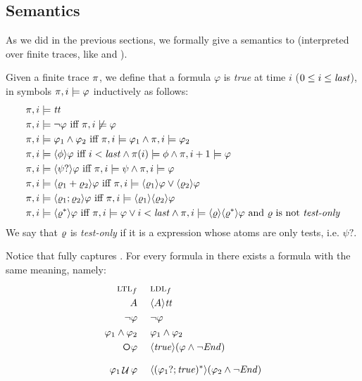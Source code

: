 \subsection{Semantics}\label{sect:ldlf-semantics}
As we did in the previous sections, we formally give a semantics to \LDLf (interpreted over finite traces, like \LTLf and \REGEX).

\begin{definition}\label{def:ldlf-truth}
	Given a finite trace $\pi$, we define that a \LDLf formula $\varphi$ is \emph{true} at time $i$ ($0 \le i \le \mathit{last}$), in symbols $\pi, i \models \varphi$ inductively as follows:
	\begin{align*}
	\pi, i &\models {\mathit{tt}}\nonumber\\
	\pi, i &\models \lnot \varphi \ \text{iff}\  \pi, i \not\models \varphi\nonumber\\
	\pi, i &\models \varphi_1 \wedge \varphi_2 \ \text{iff}\  \pi, i \models \varphi_1 \wedge \pi, i \models \varphi_2\nonumber\\
	\pi, i &\models \langle \phi \rangle\varphi \ \text{iff}\  i<\mathit{last} \wedge \pi(i) \models \phi \wedge \pi, i+1 \models \varphi\\
	\pi, i &\models \langle \psi? \rangle\varphi \ \text{iff}\  \pi, i \models \psi \wedge \pi, i \models \varphi\\
	\pi, i &\models \langle \varrho_1 + \varrho_2 \rangle\varphi \ \text{iff}\  \pi, i \models \langle \varrho_1 \rangle\varphi \vee \langle \varrho_2 \rangle\varphi\\
	\pi, i &\models \langle \varrho_1 ; \varrho_2 \rangle\varphi \ \text{iff}\  \pi, i \models \langle \varrho_1 \rangle\langle \varrho_2 \rangle\varphi\\
	\pi, i &\models \langle \varrho^* \rangle\varphi \ \text{iff}\  \pi, i \models \varphi
	\vee i<\mathit{last} \wedge \pi, i \models \langle \varrho \rangle\langle \varrho^* \rangle\varphi \text{ and $\varrho$ is not \emph{test-only}}
	\end{align*}
	We say that $\varrho$ is \emph{test-only} if it is a \RE expression whose atoms are only tests, i.e. $\psi?$.
\end{definition}

Notice that \LDLf fully captures \LTLf. For every formula in \LTLf there exists a \LDLf formula with the same meaning, namely:
\begin{align*}
	\textsc{ltl}_f &\ind \textsc{ldl}_f\\
	A  &\ind  \DIAM{A}\ttrue\\
	\lnot \varphi &\ind \lnot \varphi\\
	\varphi_1 \lAND \varphi_2 &\ind \varphi_1 \lAND \varphi_2\\
	\Next \varphi &\ind \DIAM{\true}(\varphi \lAND \lnot\Ended)\\
	\varphi_1 \lUntil \varphi &\ind \DIAM{(\varphi_1?; \true)^*}(\varphi_2 \lAND\lnot \Ended)
\end{align*}

